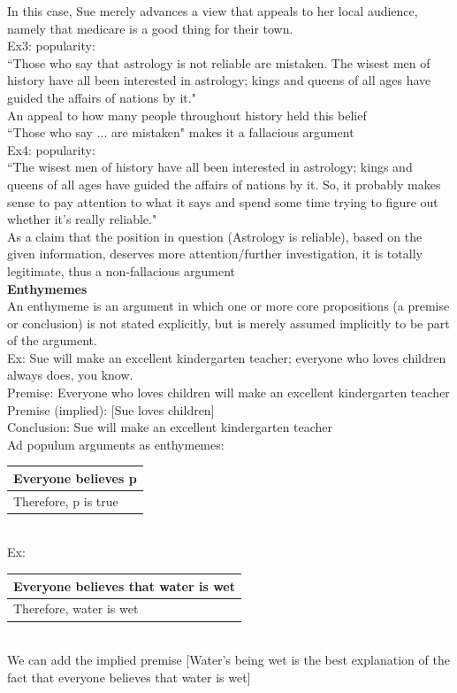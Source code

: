 \documentclass[11pt, fleqn]{article}
\begin{document}
In this case, Sue merely advances a view that appeals to her local audience, namely that medicare is a good thing for their town.\\

Ex3: popularity:\\
``Those who say that astrology is not reliable are mistaken. The wisest men of history have all been interested in astrology; kings and queens of all ages have guided the affairs of nations by it."\\

An appeal to how many people throughout history held this belief\\
``Those who say ... are mistaken" makes it a fallacious argument\\

Ex4: popularity:\\
``The wisest men of history have all been interested in astrology; kings and queens of all ages have guided the affairs of nations by it. So, it probably makes sense to pay attention to what it says and spend some time trying to figure out whether it's really reliable."\\

As a claim that the position in question (Astrology is reliable), based on the given information, deserves more attention/further investigation, it is totally legitimate, thus a non-fallacious argument\\

\textbf{Enthymemes}\\
An enthymeme is an argument in which one or more core propositions (a premise or conclusion) is not stated explicitly, but is merely assumed implicitly to be part of the argument.\\

Ex: Sue will make an excellent kindergarten teacher; everyone who loves children always does, you know.\\
Premise: Everyone who loves children will make an excellent kindergarten teacher\\
Premise (implied): [Sue loves children]\\
Conclusion: Sue will make an excellent kindergarten teacher\\

Ad populum arguments as enthymemes:\\
\begin{tabular}{p{5cm}}
    Everyone believes p\\
    \hline
    Therefore, p is true
\end{tabular}\\
Ex:\\
\begin{tabular}{p{6cm}}
    Everyone believes that water is wet\\
    \hline
    Therefore, water is wet
\end{tabular}\\
We can add the implied premise [Water's being wet is the best explanation of the fact that everyone believes that water is wet]\\
\end{document}
